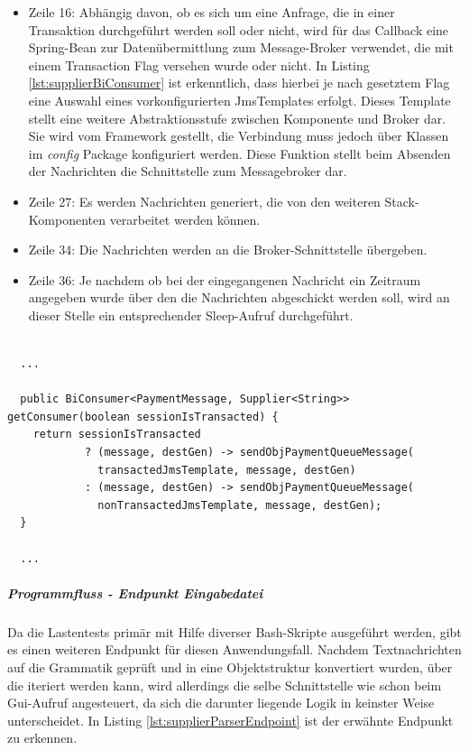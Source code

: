 \begin{itemize}
  \item Zeile 16: Abhängig davon, ob es sich um eine Anfrage, die in einer Transaktion durchgeführt werden soll oder nicht, wird für das Callback eine Spring-Bean zur Datenübermittlung zum Message-Broker verwendet, die mit einem Transaction Flag versehen wurde oder nicht. In Listing \ref{lst:supplierBiConsumer} ist erkenntlich, dass hierbei je nach gesetztem Flag eine Auswahl eines vorkonfigurierten JmsTemplates erfolgt. Dieses Template stellt eine weitere Abstraktionsstufe zwischen Komponente und Broker dar. Sie wird vom Framework gestellt, die Verbindung muss jedoch über Klassen im \emph{config} Package konfiguriert werden. Diese Funktion stellt beim Absenden der Nachrichten die Schnittstelle zum Messagebroker dar.

  \item Zeile 27: Es werden Nachrichten generiert, die von den weiteren Stack-Komponenten verarbeitet werden können.

  \item Zeile 34: Die Nachrichten werden an die Broker-Schnittstelle übergeben.

  \item Zeile 36: Je nachdem ob bei der eingegangenen Nachricht ein Zeitraum angegeben wurde über den die Nachrichten abgeschickt werden soll, wird an dieser Stelle ein entsprechender Sleep-Aufruf durchgeführt.

\end{itemize}


\begin{lstlisting}[style=javaStyle,caption={Supplier - Bi Consumer},label=lst:supplierBiConsumer]

  ...

  public BiConsumer<PaymentMessage, Supplier<String>> getConsumer(boolean sessionIsTransacted) {
    return sessionIsTransacted
            ? (message, destGen) -> sendObjPaymentQueueMessage(
              transactedJmsTemplate, message, destGen)
            : (message, destGen) -> sendObjPaymentQueueMessage(
              nonTransactedJmsTemplate, message, destGen);
  }

  ...

\end{lstlisting}


\subparagraph{Programmfluss - Endpunkt Eingabedatei}
Da die Lastentests primär mit Hilfe diverser Bash-Skripte ausgeführt werden, gibt es einen weiteren Endpunkt für diesen Anwendungsfall. Nachdem Textnachrichten auf die Grammatik geprüft und in eine Objektstruktur konvertiert wurden, über die iteriert werden kann, wird allerdings die selbe Schnittstelle wie schon beim Gui-Aufruf angesteuert, da sich die darunter liegende Logik in keinster Weise unterscheidet. In Listing \ref{lst:supplierParserEndpoint} ist der erwähnte Endpunkt zu erkennen.

